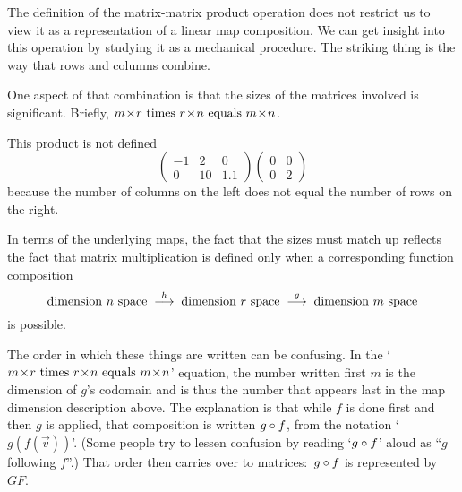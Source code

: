 The definition of the matrix-matrix product operation
does not restrict 
us to view it as a representation of a linear map composition.
We can get insight into this operation
by studying it as a mechanical procedure.
The striking thing is the way that rows and columns combine.

One aspect of that combination is that 
the sizes of the matrices involved is significant.
Briefly,
$\nbym{m}{r}\text{\ times\ }\nbym{r}{n}\text{\ equals\ }\nbym{m}{n}$.

\begin{example}
This product is not defined 
\begin{equation*}
     \begin{pmatrix}
       -1  &2  &0  \\
        0  &10 &1.1
     \end{pmatrix}
     \begin{pmatrix}
        0  &0  \\
        0  &2
     \end{pmatrix}
\end{equation*}
because the number of columns on the left 
does not equal the number of rows on the right. 
\end{example}

\par\noindent In terms of the underlying maps, 
the fact that the sizes must match up
reflects the fact that matrix multiplication is defined only when a 
corresponding function composition 
\begin{equation*}
  \text{dimension \( n \) space}
  \;\stackrel{h}{\longrightarrow}\;
  \text{dimension \( r \) space}
  \;\stackrel{g}{\longrightarrow}\;
  \text{dimension \( m \) space}
\end{equation*}
is possible.

\begin{remark}
The order in which these things are written can be confusing.
In the
`$\nbym{m}{r}\text{\ times\ }\nbym{r}{n}\text{\ equals\ }\nbym{m}{n}$'
equation, the number written first $m$ is the dimension of
$g$'s codomain and is thus the number that appears last in the
map dimension description above.
The explanation is that while $f$ is done first
and then $g$ is applied, 
that composition is written $g\mathbin\circ f$,
from the notation `$g(f(\vec{v}))$'. 
(Some people try to lessen confusion by reading 
`$g\mathbin\circ f$' aloud as ``$g$ following $f$''.)
That order then carries over to matrices:~$g\mathbin\circ f$
is represented by $GF$.
\end{remark}

